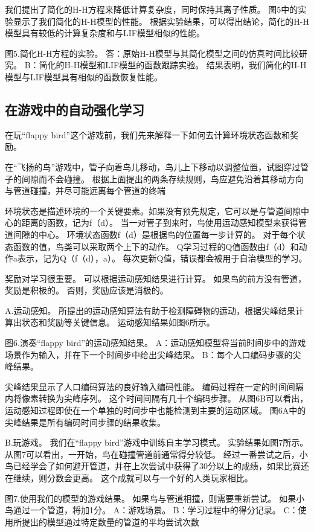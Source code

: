 \documentclass[a4paper,12pt]{ctexart}
\begin{document}
我们提出了简化的H-H方程来降低计算复杂度，同时保持其离子性质。 图5中的实验显示了我们简化的H-H模型的性能。 根据实验结果，可以得出结论，简化的H-H模型具有较低的计算复杂度和与LIF模型相似的性能。

图5.简化H-H方程的实验。 答：原始H-H模型与其简化模型之间的仿真时间比较研究。 B：简化的H-H模型和LIF模型的函数跟踪实验。 结果表明，我们简化的H-H模型与LIF模型具有相似的函数恢复性能。

\subsection{在游戏中的自动强化学习}
在玩“flappy bird”这个游戏前，我们先来解释一下如何去计算环境状态函数和奖励。

在“飞扬的鸟”游戏中，管子向着鸟儿移动，鸟儿上下移动以调整位置，试图穿过管子的间隙而不会碰撞。 根据上面提出的两条存续规则，鸟应避免沿着其移动方向与管道碰撞，并尽可能远离每个管道的终端

环境状态是描述环境的一个关键要素。如果没有预先规定，它可以是与管道间隙中心的距离的函数，记为f（d）。 当一对管子到来时，鸟使用运动感知模型来获得管道间隙的中心。 环境状态函数f（d）是根据鸟的位置每一步计算的。 对于每个状态函数的值，鸟类可以采取两个上下的动作。 Q学习过程的Q值函数由f（d）和动作a表示，记为Q（f（d），a）。 每次更新Q值，错误都会被用于自治模型的学习。

奖励对学习很重要。 可以根据运动感知结果进行计算。 如果鸟的前方没有管道，奖励是积极的。 否则，奖励应该是消极的。

A.运动感知。 所提出的运动感知算法有助于检测障碍物的运动，根据尖峰结果计算出状态和奖励等关键信息。 运动感知结果如图6所示。

图6.演奏“flappy bird”的运动感知结果。 A：运动感知模型将当前时间步中的游戏场景作为输入，并在下一个时间步中给出尖峰结果。 B：每个人口编码步骤的尖峰结果。

尖峰结果显示了人口编码算法的良好输入编码性能。 编码过程在一定的时间间隔内将像素转换为尖峰序列。 这个时间间隔有几十个编码步骤。 从图6B可以看出，运动感知过程即使在一个单独的时间步中也能检测到主要的运动区域。 图6A中的尖峰结果是所有编码时间步骤的结果收集。

B.玩游戏。 我们在“flappy bird”游戏中训练自主学习模式。 实验结果如图7所示。从图7可以看出，一开始，鸟在碰撞管道前通常得分较低。 经过一番尝试之后，小鸟已经学会了如何避开管道，并在上次尝试中获得了30分以上的成绩，如果比赛还在继续，则分数会更高。 这个成就可以与一个好的人类玩家相比。


图7.使用我们的模型的游戏结果。 如果鸟与管道相撞，则需要重新尝试。 如果小鸟通过一个管道，将加1分。 A：游戏场景。 B：学习过程中的得分记录。 C：使用所提出的模型通过特定数量的管道的平均尝试次数
\end{document}
